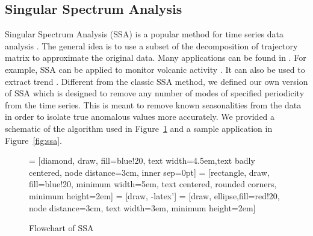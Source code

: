 \subsection{Singular Spectrum Analysis}
Singular Spectrum Analysis (SSA) is a popular method for time series
data analysis \cite{golyandina2013singular, golyandina2014basic}. The
general idea is to use a subset of the decomposition of trajectory
matrix to approximate the original data. Many applications can be found
in \cite{golyandina2013singular}. For example, SSA can be applied to
monitor volcanic activity \cite{bozzo2010relationship}. It can also be
used to extract trend \cite{alexandrov2008method}. Different from the
classic SSA method, we defined our own version of SSA which is designed
to remove any number of modes of specified periodicity from the time
series. This is meant to remove known seasonalities from the data in 
order to isolate true anomalous values more accurately. We provided a 
schematic of the algorithm used in Figure~\ref{fig:pcs} and a sample 
application in Figure~\ref{fig:ssa}.

\begin{figure}[ht]
    \centering
     = [diamond, draw, fill=blue!20, text width=4.5em,text badly centered, node distance=3cm, inner sep=0pt]
     = [rectangle, draw, fill=blue!20, minimum width=5em, text centered, rounded corners, minimum height=2em]
     = [draw, -latex']
     = [draw, ellipse,fill=red!20, node distance=3cm, text width=3em, minimum height=2em]
    \caption{Flowchart of SSA}
    \label{fig:pcs}
\end{figure}

